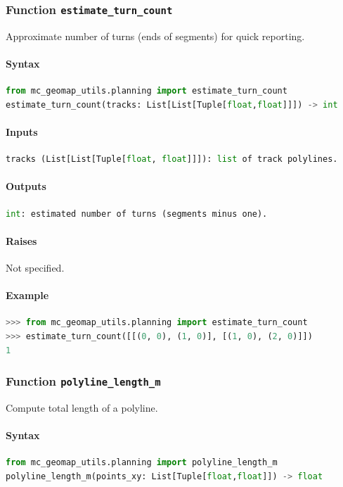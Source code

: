 \documentclass[11pt]{article}
\begin{document}
\subsubsection{Function \texttt{estimate\_turn\_count}}
Approximate number of turns (ends of segments) for quick reporting.

\paragraph{Syntax}
\begin{lstlisting}[language=Python]
from mc_geomap_utils.planning import estimate_turn_count
estimate_turn_count(tracks: List[List[Tuple[float,float]]]) -> int
\end{lstlisting}
\paragraph{Inputs}
\begin{lstlisting}[language=Python]
tracks (List[List[Tuple[float, float]]]): list of track polylines.
\end{lstlisting}
\paragraph{Outputs}
\begin{lstlisting}[language=Python]
int: estimated number of turns (segments minus one).
\end{lstlisting}
\paragraph{Raises}
Not specified.
\paragraph{Example}
\begin{lstlisting}[language=Python]
>>> from mc_geomap_utils.planning import estimate_turn_count
>>> estimate_turn_count([[(0, 0), (1, 0)], [(1, 0), (2, 0)]])
1
\end{lstlisting}

\subsubsection{Function \texttt{polyline\_length\_m}}
Compute total length of a polyline.

\paragraph{Syntax}
\begin{lstlisting}[language=Python]
from mc_geomap_utils.planning import polyline_length_m
polyline_length_m(points_xy: List[Tuple[float,float]]) -> float
\end{lstlisting}
\end{document}
